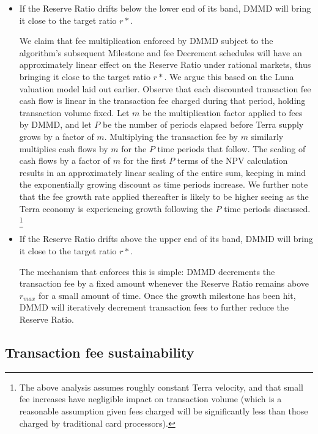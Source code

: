 \documentclass{article}
\begin{document}
\begin{itemize}
    \item If the Reserve Ratio drifts below the lower end of its band, DMMD will bring it close to the target ratio $r*$.
    
    We claim that fee multiplication enforced by DMMD subject to the algorithm's subsequent Milestone and fee Decrement schedules will have an approximately linear effect on the Reserve Ratio under rational markets, thus bringing it close to the target ratio $r*$. We argue this based on the Luna valuation model laid out earlier. Observe that each discounted transaction fee cash flow is linear in the transaction fee charged during that period, holding transaction volume fixed. Let $m$ be the multiplication factor applied to fees by DMMD, and let $P$ be the number of periods elapsed before Terra supply grows by a factor of $m$. Multiplying the transaction fee by $m$ similarly multiplies cash flows by $m$ for the $P$ time periods that follow. The scaling of cash flows by a factor of $m$ for the first $P$ terms of the NPV calculation results in an approximately linear scaling of the entire sum, keeping in mind the exponentially growing discount as time periods increase. We further note that the fee growth rate applied thereafter is likely to be higher seeing as the Terra economy is experiencing growth following the $P$ time periods discussed. \footnote{The above analysis assumes roughly constant Terra velocity, and that small fee increases have negligible impact on transaction volume (which is a reasonable assumption given fees charged will be significantly less than those charged by traditional card processors).}
    
    \item If the Reserve Ratio drifts above the upper end of its band, DMMD will bring it close to the target ratio $r*$.
    
    The mechanism that enforces this is simple: DMMD decrements the transaction fee by a fixed amount whenever the Reserve Ratio remains above $r_{max}$ for a small amount of time. Once the growth milestone has been hit, DMMD will iteratively decrement transaction fees to further reduce the Reserve Ratio.
    
\end{itemize}

\subsection{Transaction fee sustainability}
\end{document}
